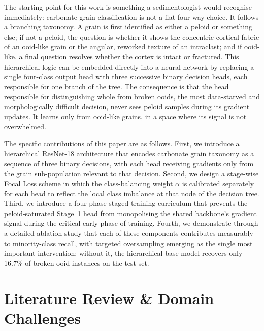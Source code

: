 \documentclass[a4paper,fleqn]{cas-dc}
\begin{document}
The starting point for this work is something a sedimentologist would recognise immediately: carbonate grain classification is not a flat four-way choice. It follows a branching taxonomy. A grain is first identified as either a peloid or something else; if not a peloid, the question is whether it shows the concentric cortical fabric of an ooid-like grain or the angular, reworked texture of an intraclast; and if ooid-like, a final question resolves whether the cortex is intact or fractured. This hierarchical logic can be embedded directly into a neural network by replacing a single four-class output head with three successive binary decision heads, each responsible for one branch of the tree. The consequence is that the head responsible for distinguishing whole from broken ooids, the most data-starved and morphologically difficult decision, never sees peloid samples during its gradient updates. It learns only from ooid-like grains, in a space where its signal is not overwhelmed.

The specific contributions of this paper are as follows. First, we introduce a hierarchical ResNet-18 architecture that encodes carbonate grain taxonomy as a sequence of three binary decisions, with each head receiving gradients only from the grain sub-population relevant to that decision. Second, we design a stage-wise Focal Loss scheme in which the class-balancing weight $\alpha$ is calibrated separately for each head to reflect the local class imbalance at that node of the decision tree. Third, we introduce a four-phase staged training curriculum that prevents the peloid-saturated Stage~1 head from monopolising the shared backbone's gradient signal during the critical early phase of training. Fourth, we demonstrate through a detailed ablation study that each of these components contributes measurably to minority-class recall, with targeted oversampling emerging as the single most important intervention: without it, the hierarchical base model recovers only 16.7\% of broken ooid instances on the test set.

\section{Literature Review \& Domain Challenges}
\end{document}
